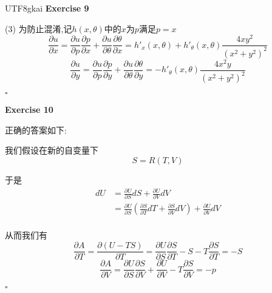 \documentclass{article}
\newenvironment{exercise}[1]{%
{\textbf{Exercise #1} \\ 
    }
}{
  \hfill $\square$ 
  \par\bigskip 
}
\newcommand{\parameter}[1]{\left(#1\right)}
\begin{document}
\begin{CJK}{UTF8}{gkai}
\begin{exercise}{9}
    (3)
    为防止混淆,记$h(x,\theta)$中的$x$为$p$满足$p = x$
    \[\frac{\partial u}{\partial x} = \frac{\partial u}{\partial p}\frac{\partial p}{\partial x} + \frac{\partial u}{\partial \theta}\frac{\partial \theta}{\partial x} = h'_x(x,\theta) + h'_\theta(x,\theta) \frac{4xy^2}{(x^2 + y^2)^2}\]
    \[\frac{\partial u}{\partial y} = \frac{\partial u}{\partial p}\frac{\partial p}{\partial y} + \frac{\partial u}{\partial \theta}\frac{\partial \theta}{\partial y} =  - h'_\theta(x,\theta) \frac{4x^2y}{(x^2 + y^2)^2}\]
\end{exercise}

\begin{exercise}{10}
    

    正确的答案如下:

    我们假设在新的自变量下
    \[S = R(T,V)\]

    于是
    \[
    \begin{aligned}    
        dU &= \frac{\partial U}{\partial S}d S + \frac{\partial U}{\partial V}dV\\
        &= \frac{\partial U}{\partial S} \parameter{\frac{\partial S}{\partial T}d T + \frac{\partial S}{\partial V} dV} + \frac{\partial U}{\partial V} dV\\
    \end{aligned}    
    \]

    从而我们有
    \[\frac{\partial A}{\partial T} = \frac{\partial(U - TS)}{\partial T} = \frac{\partial U}{\partial S}\frac{\partial S}{\partial T} - S - T\frac{\partial S}{\partial T} = -S\]
    \[\frac{\partial A}{\partial V} = \frac{\partial U}{\partial S}\frac{\partial S}{\partial V} + \frac{\partial U}{\partial V} - T\frac{\partial S}{\partial V} = -p\]
    
\end{exercise}


\end{CJK}
\end{document}
